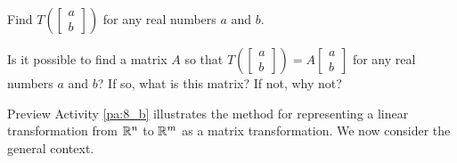 \begin{pa}
	\item Find $T\left(\left[ \begin{array}{c} a \\ b \end{array} \right] \right)$ for any real numbers $a$ and $b$.


	\item Is it possible to find a matrix $A$ so that $T\left(\left[ \begin{array}{c} a \\ b \end{array} \right] \right) = A \left[ \begin{array}{c} a \\ b \end{array} \right]$ for any real numbers $a$ and $b$? If so, what is this matrix? If not, why not?


	\ee

\end{pa}


Preview Activity \ref{pa:8_b} illustrates the method for representing a linear transformation from $\mathbb{R}^n$ to $\mathbb{R}^m$ as a matrix transformation. We now consider the general context. 


